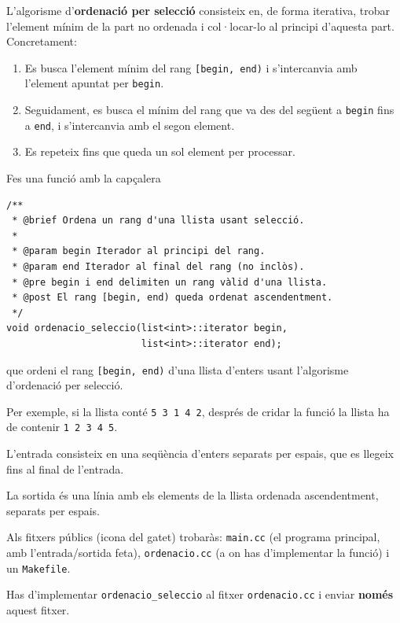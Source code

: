 

\Statement

L'algorisme d'\textbf{ordenació per selecció} consisteix en, de forma iterativa, trobar l'element mínim de la part no ordenada i col·locar-lo al principi d'aquesta part. Concretament:

\begin{enumerate}
\item Es busca l'element mínim del rang \verb|[begin, end)| i s'intercanvia amb l'element apuntat per \verb|begin|.
\item Seguidament, es busca el mínim del rang que va des del següent a \verb|begin| fins a \verb|end|, i s'intercanvia amb el segon element.
\item Es repeteix fins que queda un sol element per processar.
\end{enumerate}

Fes una funció amb la capçalera
\begin{verbatim}
/**
 * @brief Ordena un rang d'una llista usant selecció.
 *
 * @param begin Iterador al principi del rang.
 * @param end Iterador al final del rang (no inclòs).
 * @pre begin i end delimiten un rang vàlid d'una llista.
 * @post El rang [begin, end) queda ordenat ascendentment.
 */
void ordenacio_seleccio(list<int>::iterator begin,
                        list<int>::iterator end);
\end{verbatim}
que ordeni el rang \verb|[begin, end)| d'una llista d'enters usant l'algorisme d'ordenació per selecció.

Per exemple, si la llista conté \verb|5 3 1 4 2|, després de cridar la funció la llista ha de contenir \verb|1 2 3 4 5|.

\Input

L'entrada consisteix en una seqüència d'enters separats per espais, que es llegeix fins al final de l'entrada.

\Output

La sortida és una línia amb els elements de la llista ordenada ascendentment, separats per espais.

\Observation

Als fitxers públics (icona del gatet) trobaràs: \verb|main.cc| (el programa principal, amb l'entrada/sortida feta), \verb|ordenacio.cc| (a on has d'implementar la funció) i un \verb|Makefile|.

Has d'implementar \verb|ordenacio_seleccio| al fitxer \verb|ordenacio.cc| i enviar \textbf{només} aquest fitxer.

\SampleTwoCol

